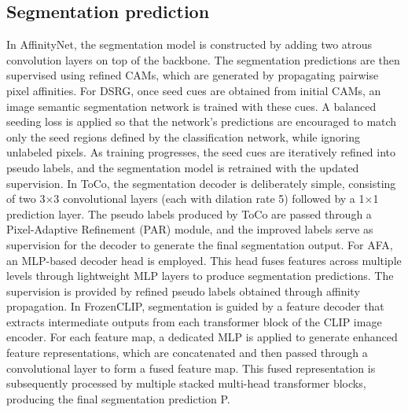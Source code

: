 \subsection{Segmentation prediction}
\label{subsec:segmentation-prediction}
In AffinityNet, the segmentation model is constructed by adding two atrous convolution layers on top of the backbone. The segmentation predictions are then supervised using refined CAMs, which are generated by propagating pairwise pixel affinities.
For DSRG, once seed cues are obtained from initial CAMs, an image semantic segmentation network is trained with these cues. A balanced seeding loss is applied so that the network’s predictions are encouraged to match only the seed regions defined by the classification network, while ignoring unlabeled pixels. As training progresses, the seed cues are iteratively refined into pseudo labels, and the segmentation model is retrained with the updated supervision.
In ToCo, the segmentation decoder is deliberately simple, consisting of two 3×3 convolutional layers (each with dilation rate 5) followed by a 1×1 prediction layer. The pseudo labels produced by ToCo are passed through a Pixel-Adaptive Refinement (PAR) module, and the improved labels serve as supervision for the decoder to generate the final segmentation output.
For AFA, an MLP-based decoder head is employed. This head fuses features across multiple levels through lightweight MLP layers to produce segmentation predictions. The supervision is provided by refined pseudo labels obtained through affinity propagation.
In FrozenCLIP, segmentation is guided by a feature decoder that extracts intermediate outputs from each transformer block of the CLIP image encoder. For each feature map, a dedicated MLP is applied to generate enhanced feature representations, which are concatenated and then passed through a convolutional layer to form a fused feature map. This fused representation is subsequently processed by multiple stacked multi-head transformer blocks, producing the final segmentation prediction P.